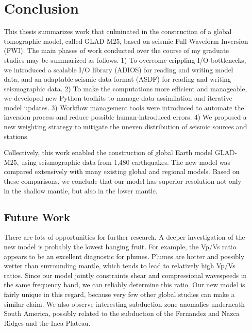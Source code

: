 \newpage
\chapter{Conclusion}
\label{ch:conclusion}

This thesis summarizes work that culminated in the construction of a global tomographic model,
called GLAD-M25, based on seismic Full Waveform Inversion (FWI).
The main phases of work conducted over the course of my graduate studies may be summarized as follows.
1) To overcome crippling I/O bottlenecks, we introduced a scalable I/O library (ADIOS) for reading and writing model data,
and an adaptable seismic data format (ASDF) for reading and writing seismographic data.
2) To make the computations more efficient and manageable,
we developed new Python toolkits to manage data assimilation and iterative model updates.
3) Workflow management tools were introduced to automate the inversion process and reduce possible
human-introduced errors.
4) We proposed a new weighting strategy to
mitigate the uneven distribution of seismic sources and stations.

Collectively, this work enabled the construction of global Earth model GLAD-M25,
using seismographic data from 1,480 earthquakes.
The new model was compared extensively with many existing global and regional models.
Based on these comparisons, we conclude that our model has superior resolution
not only in the shallow mantle, but also in the lower mantle.

\section{Future Work}

There are lots of opportunities for further research.
A deeper investigation of the new model is probably the lowest hanging fruit.
For example, the Vp/Vs ratio appears to be an excellent diagnostic for plumes.
Plumes are hotter and possibly wetter than surrounding mantle, which tends to lead to relatively high Vp/Vs ratios.
Since our model jointly constraints shear and compressional wavespeeds in the same frequency band,
we can reliably determine this ratio.
Our new model is fairly unique in this regard,
because very few other global studies can make a similar claim.
We also observe interesting subduction zone anomalies underneath South America,
possibly related to the subduction of the Fernandez and Nazca Ridges and the Inca Plateau.

